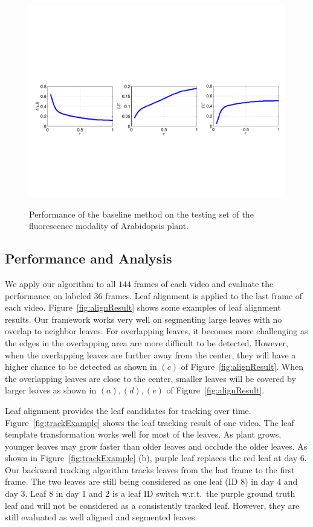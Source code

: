 \begin{figure}
\centering
\includegraphics[width=.81\textwidth]{Figures/performance.pdf}\\
\caption{Performance of the baseline method on the testing set of the fluorescence modality of Arabidopsis plant.}
\label{fig:performance}
\end{figure}


\subsection{Performance and Analysis}
We apply our algorithm to all $144$ frames of each video and evaluate the performance on labeled $36$ frames.
Leaf alignment is applied to the last frame of each video.
Figure~\ref{fig:alignResult} shows some examples of leaf alignment results.
Our framework works very well on segmenting large leaves with no overlap to neighbor leaves.
For overlapping leaves, it becomes more challenging as the edges in the overlapping area are more difficult to be detected.
However, when the overlapping leaves are further away from the center, they will have a higher chance to be detected as shown in $(c)$ of Figure~\ref{fig:alignResult}.
When the overlapping leaves are close to the center, smaller leaves will be covered by larger leaves as shown in $(a), (d), (e)$ of Figure~\ref{fig:alignResult}.


Leaf alignment provides the leaf candidates for tracking over time.
Figure~\ref{fig:trackExample} shows the leaf tracking result of one video.
The leaf template transformation works well for most of the leaves.
As plant grows, younger leaves may grow faster than older leaves and occlude the older leaves.
As shown in Figure~\ref{fig:trackExample} (b), purple leaf replaces the red leaf at day $6$.
Our backward tracking algorithm tracks leaves from the last frame to the first frame.
The two leaves are still being considered as one leaf (ID $8$) in day $4$ and day $3$.
Leaf $8$ in day $1$ and $2$ is a leaf ID switch w.r.t.~the purple ground truth leaf and will not be considered as a consistently tracked leaf.
However, they are still evaluated as well aligned and segmented leaves.


